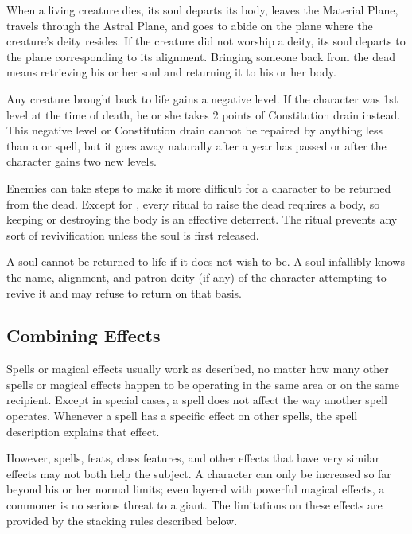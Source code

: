When a living creature dies, its soul departs its body, leaves the Material Plane, travels through the Astral Plane, and goes to abide on the plane where the creature's deity resides. If the creature did not worship a deity, its soul departs to the plane corresponding to its alignment. Bringing someone back from the dead means retrieving his or her soul and returning it to his or her body.

 Any creature brought back to life gains a negative level. If the character was 1st level at the time of death, he or she takes 2 points of Constitution drain instead. This negative level or Constitution drain cannot be repaired by anything less than a  or  spell, but it goes away naturally after a year has passed or after the character gains two new levels.

 Enemies can take steps to make it more difficult for a character to be returned from the dead. Except for , every ritual to raise the dead requires a body, so keeping or destroying the body is an effective deterrent. The  ritual prevents any sort of revivification unless the soul is first released.

 A soul cannot be returned to life if it does not wish to be. A soul infallibly knows the name, alignment, and patron deity (if any) of the character attempting to revive it and may refuse to return on that basis.


\subsection{Combining Effects}
Spells or magical effects usually work as described, no matter how many other spells or magical effects happen to be operating in the same area or on the same recipient. Except in special cases, a spell does not affect the way another spell operates. Whenever a spell has a specific effect on other spells, the spell description explains that effect.

However, spells, feats, class features, and other effects that have very similar effects may not both help the subject. A character can only be increased so far beyond his or her normal limits; even layered with powerful magical effects, a commoner is no serious threat to a giant. The limitations on these effects are provided by the stacking rules described below.

